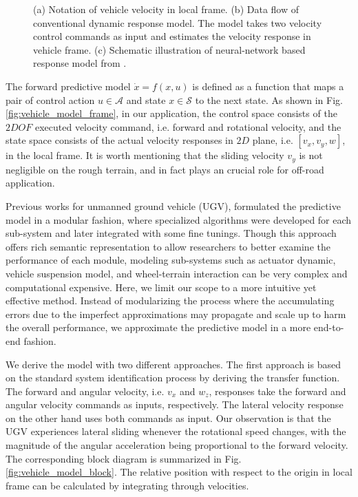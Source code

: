 \documentclass[../thesis.tex]{subfiles}
\begin{document}
\begin{figure}[t]
\begin{subfigure}[b]{0.8\linewidth}
		\subcaption{}
		\label{fig:vehicle_model_net}
	\end{subfigure}
	\caption{(a) Notation of vehicle velocity in local frame. (b) Data flow of conventional dynamic response model. The model takes two velocity control commands as input and estimates the velocity response in vehicle frame. (c) Schematic illustration of neural-network based response model from \cite{bode2007learning}.}
    \label{fig:vehicle_model}
\end{figure}


The forward predictive model $\dot{x}=f(x,u)$ is defined as a function that maps a pair of control action $u \in \mathcal{A}$ and state $x \in \mathcal{S}$ to the next state. As shown in Fig. \ref{fig:vehicle_model_frame}, in our application, the control space consists of the $2DOF$ executed velocity command, i.e. forward and rotational velocity, and the state space consists of the actual velocity responses in $2D$ plane, i.e. $[v_x, v_y, w]$, in the local frame. It is worth mentioning that the sliding velocity $v_y$ is not negligible on the rough terrain, and in fact plays an crucial role for off-road application.


Previous works \cite{kelly2007terrain,howard2006trajectory,howard2005terrain} for unmanned ground vehicle (UGV), formulated the predictive model in a modular fashion, where specialized algorithms were developed for each sub-system and later integrated with some fine tunings. Though this approach offers rich semantic representation to allow researchers to better examine the performance of each module, modeling sub-systems such as actuator dynamic, vehicle suspension model, and wheel-terrain interaction can be very complex and computational expensive. 
Here, we limit our scope to a more intuitive yet effective method. Instead of modularizing the process where the accumulating errors due to the imperfect approximations may propagate and scale up to harm the overall performance, we approximate the predictive model in a more end-to-end fashion. 

We derive the model with two different approaches. The first approach is based on the standard system identification process by deriving the transfer function. The forward and angular velocity, i.e. $v_x$ and $w_z$, responses take the forward and angular velocity commands as inputs, respectively. The lateral velocity response on the other hand uses both commands as input. Our observation is that the UGV experiences lateral sliding whenever the rotational speed changes, with the magnitude of the angular acceleration being proportional to the forward velocity. The corresponding block diagram is summarized in Fig. \ref{fig:vehicle_model_block}. The relative position with respect to the origin in local frame can be calculated by integrating through velocities.
\end{document}
